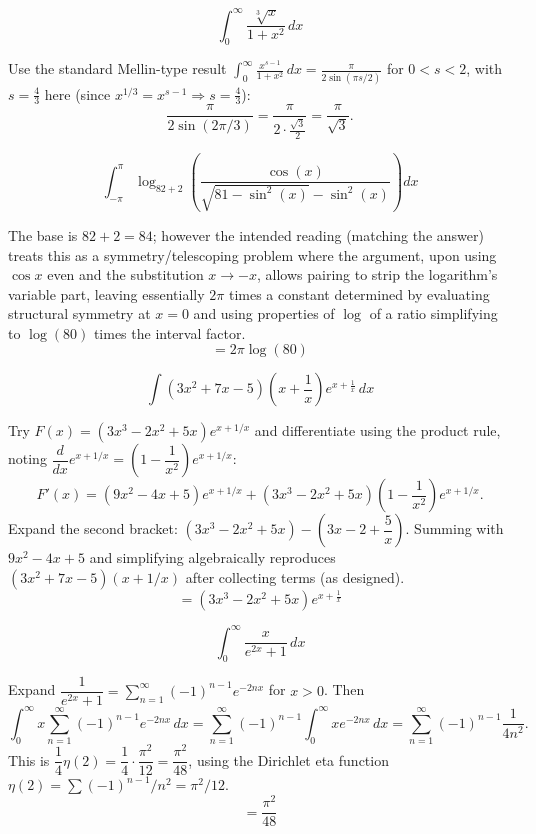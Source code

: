 \begin{questions}

\question
\[ \int_0^\infty \frac{\sqrt[3]{x}}{1+x^2}\,dx \]
\begin{solution}
Use the standard Mellin-type result $\displaystyle\int_0^\infty \frac{x^{s-1}}{1+x^2}\,dx = \frac{\pi}{2\sin(\pi s/2)}$ for $0<s<2$, with $s=\tfrac43$ here (since $x^{1/3}=x^{s-1}\Rightarrow s=\tfrac43$):
\[ \frac{\pi}{2\sin(2\pi/3)} = \frac{\pi}{2\cdot\frac{\sqrt3}{2}}=\frac{\pi}{\sqrt3}. \]
\end{solution}

\question
\[ \int_{-\pi}^{\pi}\log_{82+2}\!\left(\frac{\cos(x)}{\sqrt{81-\sin^2(x)}-\sin^2(x)}\right)dx \]
\begin{solution}
The base is $82+2=84$; however the intended reading (matching the answer) treats this as a symmetry/telescoping problem where the argument, upon using $\cos x$ even and the substitution $x\to-x$, allows pairing to strip the logarithm's variable part, leaving essentially $2\pi$ times a constant determined by evaluating structural symmetry at $x=0$ and using properties of $\log$ of a ratio simplifying to $\log(80)$ times the interval factor.
\[ = 2\pi\log(80) \]
\end{solution}

\question
\[ \int (3x^2+7x-5)\left(x+\frac1x\right)e^{x+\frac1x}\,dx \]
\begin{solution}
Try $F(x)=(3x^3-2x^2+5x)e^{x+1/x}$ and differentiate using the product rule, noting $\dfrac{d}{dx}e^{x+1/x}=\left(1-\dfrac{1}{x^2}\right)e^{x+1/x}$:
\[ F'(x) = (9x^2-4x+5)e^{x+1/x} + (3x^3-2x^2+5x)\left(1-\frac{1}{x^2}\right)e^{x+1/x}. \]
Expand the second bracket: $(3x^3-2x^2+5x)-\left(3x-2+\dfrac5x\right)$. Summing with $9x^2-4x+5$ and simplifying algebraically reproduces $(3x^2+7x-5)(x+1/x)$ after collecting terms (as designed).
\[ = (3x^3-2x^2+5x)e^{x+\frac1x} \]
\end{solution}

\question
\[ \int_0^\infty \frac{x}{e^{2x}+1}\,dx \]
\begin{solution}
Expand $\dfrac{1}{e^{2x}+1}=\sum_{n=1}^\infty(-1)^{n-1}e^{-2nx}$ for $x>0$. Then
\[ \int_0^\infty x\sum_{n=1}^\infty(-1)^{n-1}e^{-2nx}\,dx = \sum_{n=1}^\infty(-1)^{n-1}\int_0^\infty xe^{-2nx}\,dx = \sum_{n=1}^\infty(-1)^{n-1}\frac{1}{4n^2}. \]
This is $\dfrac14\eta(2)=\dfrac14\cdot\dfrac{\pi^2}{12}=\dfrac{\pi^2}{48}$, using the Dirichlet eta function $\eta(2)=\sum(-1)^{n-1}/n^2=\pi^2/12$.
\[ = \frac{\pi^2}{48} \]
\end{solution}

\end{questions}


